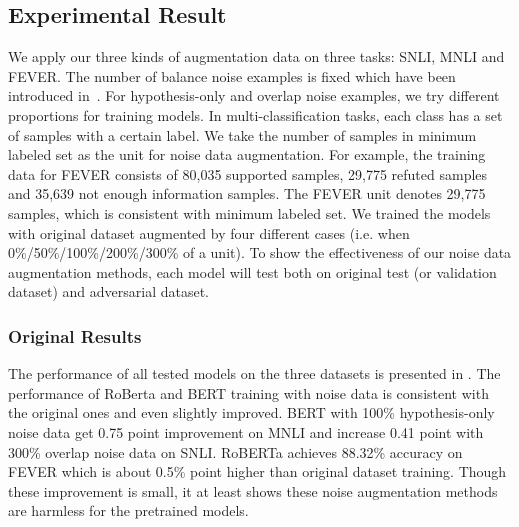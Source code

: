 \subsection{Experimental Result}
We apply our three kinds of augmentation data on three tasks: SNLI, MNLI and FEVER. 
The number of balance noise examples
is fixed which have been introduced in~. 
For hypothesis-only and overlap noise examples, 
we try different proportions for training models. 
In multi-classification tasks, each class has a set of samples with a certain label. 
We take the number of samples in minimum labeled set 
as the unit for noise data augmentation. 
For example, the training data for FEVER consists of 80,035 supported samples, 29,775 refuted samples
and 35,639 not enough information samples. 
The FEVER unit denotes 29,775 samples, which is consistent with minimum labeled set.
We trained the models with original dataset augmented by four different cases (i.e. when
0\%/50\%/100\%/200\%/300\% of a unit).
To show the effectiveness of our noise data augmentation methods, 
each model will test both on original test (or validation 
dataset) and adversarial dataset. 


\subsubsection{Original Results}

The performance of all tested models on the three datasets 
is presented in .
The performance of RoBerta  and BERT training with noise data 
is consistent with the original ones and even slightly improved. 
BERT with 100\% hypothesis-only noise data get 0.75 point improvement on MNLI 
and increase 0.41 point with 300\% overlap noise data on SNLI. 
RoBERTa achieves 88.32\% accuracy on FEVER which is about 0.5\% point 
higher than original dataset training. Though these improvement is small, it at least shows 
these noise augmentation methods are harmless for the pretrained models.

